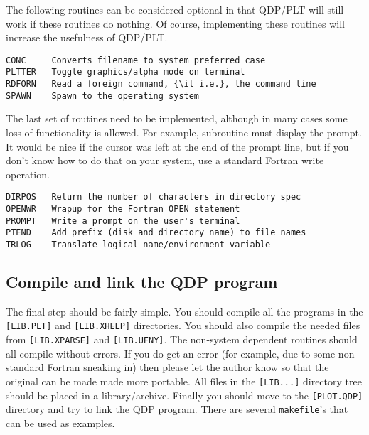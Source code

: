 The following routines can be considered optional in that QDP/PLT
will still work if these routines do nothing.  Of course, implementing
these routines will increase the usefulness of QDP/PLT.
\begin{verbatim}
CONC     Converts filename to system preferred case
PLTTER   Toggle graphics/alpha mode on terminal
RDFORN   Read a foreign command, {\it i.e.}, the command line
SPAWN    Spawn to the operating system
\end{verbatim}

The last set of routines need to be implemented, although in many
cases some loss of functionality is allowed.
For example, subroutine \verb@PROMT@ must display the prompt.
It would be nice if the cursor was left at
the end of the prompt line, but if you don't know how to do that on
your system, use a standard Fortran write operation.
\begin{verbatim}
DIRPOS   Return the number of characters in directory spec
OPENWR   Wrapup for the Fortran OPEN statement
PROMPT   Write a prompt on the user's terminal
PTEND    Add prefix (disk and directory name) to file names
TRLOG    Translate logical name/environment variable
\end{verbatim}

\subsection{Compile and link the QDP program}

The final step should be fairly simple.
You should compile all the programs in the {\tt [LIB.PLT]} and
{\tt [LIB.XHELP]} directories.
You should also compile the needed files from {\tt [LIB.XPARSE]} and
{\tt [LIB.UFNY]}.
The non-system dependent routines should all compile without
errors.
If you do get an error (for example, due to some non-standard Fortran
sneaking in) then please let the author know so that the original can be
made made more portable.
All files in the {\tt [LIB...]} directory tree should be placed
in a library/archive.
Finally you should move to the {\tt [PLOT.QDP]} directory and
try to link the QDP program.
There are several {\tt makefile}'s that can be used as examples.
